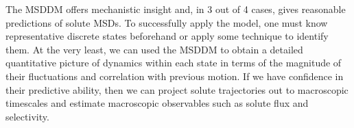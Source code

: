 \documentclass[12pt]{article}
\begin{document}
  The MSDDM offers mechanistic insight and, in 3 out of 4 cases, gives reasonable
  predictions of solute MSDs. To successfully apply the model, one must know 
  representative discrete states beforehand or apply some technique to identify
  them. At the very least, we can used the MSDDM to obtain a detailed quantitative
  picture of dynamics within each state in terms of the magnitude of their 
  fluctuations and correlation with previous motion. If we have confidence in
  their predictive ability, then we can project solute trajectories out to 
  macroscopic timescales and estimate macroscopic observables such as solute 
  flux and selectivity.
  
  
%  
  
\end{document}
